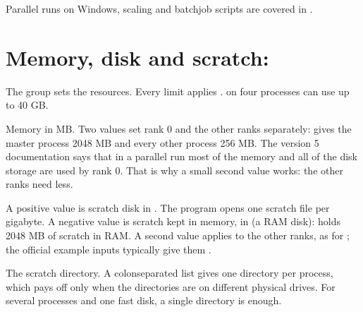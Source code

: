 \documentclass[letterpaper,10pt,english,openany,oneside]{sphinxmanual}
\begin{document}
\sphinxAtStartPar
Parallel runs on Windows, scaling and batch\sphinxhyphen{}job scripts are covered in {\hyperref[\detokenize{start/parallel::doc}]{}}.


\section{Memory, disk and scratch: }
\label{\detokenize{start/running:memory-disk-and-scratch-system}}
\sphinxAtStartPar
The {\hyperref[\detokenize{reference/system:group-system}]{}} group sets the resources. Every limit applies .
 on four processes can use up to 40 GB.



\begin{sphinxVerbatim}[commandchars=\\\{\}]
\end{sphinxVerbatim}
\begin{description}
\sphinxAtStartPar
Memory in MB. Two values set rank 0 and the other ranks separately:  gives the master process
2048 MB and every other process 256 MB. The version 5 documentation says that in a parallel run most of the memory and
all of the disk storage are used by rank 0. That is why a small second value works: the other ranks need less.



\sphinxAtStartPar
A positive value is scratch disk in . The program opens one scratch file per gigabyte. A negative value is
scratch kept in memory, in  (a RAM disk):  holds 2048 MB of scratch in RAM. A second value
applies to the other ranks, as for ; the official example inputs typically give them .



\sphinxAtStartPar
The scratch directory. A colon\sphinxhyphen{}separated list gives one directory per process, which pays off only when the
directories are on different physical drives. For several processes and one fast disk, a single directory is
enough.



\end{description}
\end{document}

